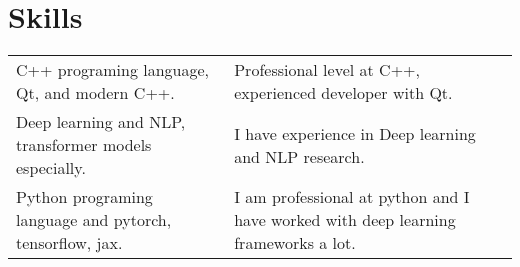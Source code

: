 \documentclass[a4paper,12pt]{article}
\begin{document}
\section{Skills}
\begin{tabularx}{\linewidth}{@{}l X@{}}
C++ programing language, Qt, and modern C++.
& \normalsize{Professional level at C++, experienced developer with Qt.} \\
Deep learning and NLP, transformer models especially.
& \normalsize{I have experience in Deep learning and NLP research.} \\
Python programing language and pytorch, tensorflow, jax.
& \normalsize{I am professional at python and I have worked with deep learning frameworks a lot.} \\
\end{tabularx}

\vfill
{}
\end{document}
